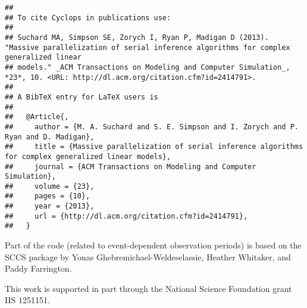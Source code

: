 \documentclass[
]{article}
\begin{document}
\begin{verbatim}
## 
## To cite Cyclops in publications use:
## 
## Suchard MA, Simpson SE, Zorych I, Ryan P, Madigan D (2013). "Massive parallelization of serial inference algorithms for complex generalized linear
## models." _ACM Transactions on Modeling and Computer Simulation_, *23*, 10. <URL: http://dl.acm.org/citation.cfm?id=2414791>.
## 
## A BibTeX entry for LaTeX users is
## 
##   @Article{,
##     author = {M. A. Suchard and S. E. Simpson and I. Zorych and P. Ryan and D. Madigan},
##     title = {Massive parallelization of serial inference algorithms for complex generalized linear models},
##     journal = {ACM Transactions on Modeling and Computer Simulation},
##     volume = {23},
##     pages = {10},
##     year = {2013},
##     url = {http://dl.acm.org/citation.cfm?id=2414791},
##   }
\end{verbatim}

Part of the code (related to event-dependent observation periods) is
based on the SCCS package by Yonas Ghebremichael-Weldeselassie, Heather
Whitaker, and Paddy Farrington.

This work is supported in part through the National Science Foundation
grant IIS 1251151.
\end{document}
